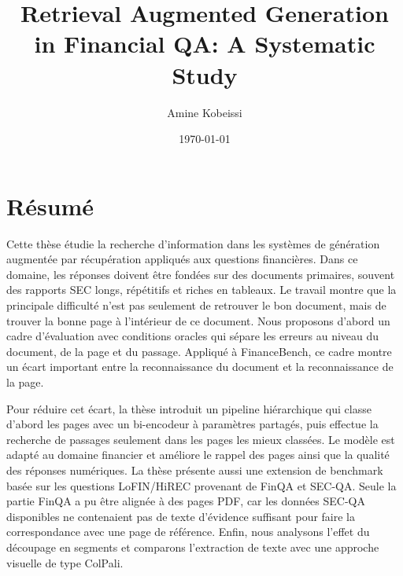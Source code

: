 \documentclass[12pt,twoside,maitrise]{dms}
\theoremstyle{definition}
\numberwithin{equation}{section}
\numberwithin{table}{chapter}
\numberwithin{figure}{chapter}
\begin{document}

\title{Retrieval Augmented Generation in Financial QA: A Systematic Study}
\author{Amine Kobeissi}
\date{\today}

\maketitle
\maketitle

\francais
\chapter*{R\'esum\'e}
Cette th\`ese \'etudie la recherche d'information dans les syst\`emes de
g\'en\'eration augment\'ee par r\'ecup\'eration appliqu\'es aux questions
financi\`eres. Dans ce domaine, les r\'eponses doivent \^etre fond\'ees sur des
documents primaires, souvent des rapports SEC longs, r\'ep\'etitifs et riches en
tableaux. Le travail montre que la principale difficult\'e n'est pas seulement de
retrouver le bon document, mais de trouver la bonne page \`a l'int\'erieur de ce
document. Nous proposons d'abord un cadre d'\'evaluation avec conditions
oracles qui s\'epare les erreurs au niveau du document, de la page et du
passage. Appliqu\'e \`a FinanceBench, ce cadre montre un \'ecart important entre
la reconnaissance du document et la reconnaissance de la page.

Pour r\'eduire cet \'ecart, la th\`ese introduit un pipeline hi\'erarchique qui
classe d'abord les pages avec un bi-encodeur \`a param\`etres partag\'es, puis
effectue la recherche de passages seulement dans les pages les mieux class\'ees.
Le mod\`ele est adapt\'e au domaine financier et am\'eliore le rappel des pages
ainsi que la qualit\'e des r\'eponses num\'eriques. La th\`ese pr\'esente aussi
une extension de benchmark bas\'ee sur les questions LoFIN/HiREC provenant de
FinQA et SEC-QA. Seule la partie FinQA a pu \^etre align\'ee \`a des pages PDF,
car les donn\'ees SEC-QA disponibles ne contenaient pas de texte d'\'evidence
suffisant pour faire la correspondance avec une page de r\'ef\'erence. Enfin,
nous analysons l'effet du d\'ecoupage en segments et comparons l'extraction de
texte avec une approche visuelle de type ColPali.
\end{document}
